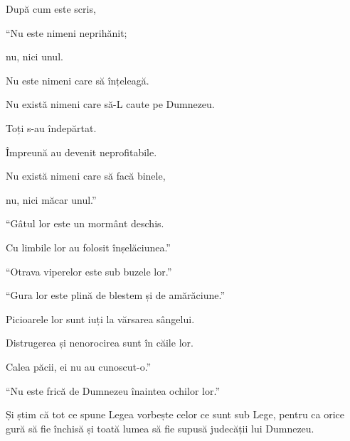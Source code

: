 {După cum este scris,

\par }{\Q “Nu este nimeni neprihănit;

\par }{\QB nu, nici unul.


\par }{\Q {}Nu este nimeni care să înțeleagă.

\par }{\QB Nu există nimeni care să-L caute pe Dumnezeu.


\par }{\Q {}Toți s-au îndepărtat.

\par }{\QB Împreună au devenit neprofitabile.

\par }{\Q Nu există nimeni care să facă binele,

\par }{\QB nu, nici măcar unul.”


\par }{\Q {}“Gâtul lor este un mormânt deschis.

\par }{\QB Cu limbile lor au folosit înșelăciunea.”

\par }{\Q “Otrava viperelor este sub buzele lor.”


\par }{\QB {}“Gura lor este plină de blestem și de amărăciune.”


\par }{\Q {}Picioarele lor sunt iuți la vărsarea sângelui.


\par }{\QB {}Distrugerea și nenorocirea sunt în căile lor.


\par }{\QB {}Calea păcii, ei nu au cunoscut-o.”


\par }{\Q {}“Nu este frică de Dumnezeu înaintea ochilor lor.”


\par }{\PP {}Și știm că tot ce spune Legea vorbește celor ce sunt sub Lege, pentru ca orice gură să fie închisă și toată lumea să fie supusă judecății lui Dumnezeu.

}
